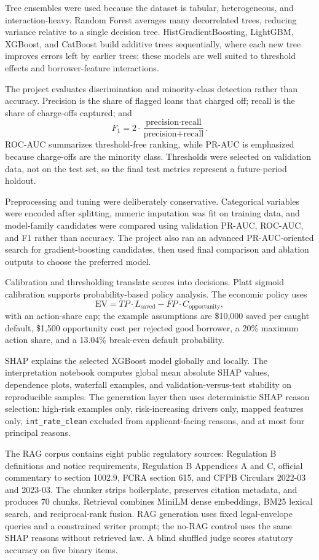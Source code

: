 \documentclass[11pt]{article}
\begin{document}
Tree ensembles were used because the dataset is tabular, heterogeneous, and interaction-heavy. Random Forest averages many decorrelated trees, reducing variance relative to a single decision tree. HistGradientBoosting, LightGBM, XGBoost, and CatBoost build additive trees sequentially, where each new tree improves errors left by earlier trees; these models are well suited to threshold effects and borrower-feature interactions.

The project evaluates discrimination and minority-class detection rather than accuracy. Precision is the share of flagged loans that charged off; recall is the share of charge-offs captured; and
\[
F_1=2\cdot\frac{\text{precision}\cdot\text{recall}}{\text{precision}+\text{recall}}.
\]
ROC-AUC summarizes threshold-free ranking, while PR-AUC is emphasized because charge-offs are the minority class. Thresholds were selected on validation data, not on the test set, so the final test metrics represent a future-period holdout.

Preprocessing and tuning were deliberately conservative. Categorical variables were encoded after splitting, numeric imputation was fit on training data, and model-family candidates were compared using validation PR-AUC, ROC-AUC, and F1 rather than accuracy. The project also ran an advanced PR-AUC-oriented search for gradient-boosting candidates, then used final comparison and ablation outputs to choose the preferred model.

Calibration and thresholding translate scores into decisions. Platt sigmoid calibration supports probability-based policy analysis. The economic policy uses
\[
\text{EV}=TP\cdot L_{\text{saved}}-FP\cdot C_{\text{opportunity}},
\]
with an action-share cap; the example assumptions are \$10,000 saved per caught default, \$1,500 opportunity cost per rejected good borrower, a 20\% maximum action share, and a 13.04\% break-even default probability.

SHAP explains the selected XGBoost model globally and locally. The interpretation notebook computes global mean absolute SHAP values, dependence plots, waterfall examples, and validation-versus-test stability on reproducible samples. The generation layer then uses deterministic SHAP reason selection: high-risk examples only, risk-increasing drivers only, mapped features only, \texttt{int\_rate\_clean} excluded from applicant-facing reasons, and at most four principal reasons.

The RAG corpus contains eight public regulatory sources: Regulation B definitions and notice requirements, Regulation B Appendices A and C, official commentary to section 1002.9, FCRA section 615, and CFPB Circulars 2022-03 and 2023-03. The chunker strips boilerplate, preserves citation metadata, and produces 70 chunks. Retrieval combines MiniLM dense embeddings, BM25 lexical search, and reciprocal-rank fusion. RAG generation uses fixed legal-envelope queries and a constrained writer prompt; the no-RAG control uses the same SHAP reasons without retrieved law. A blind shuffled judge scores statutory accuracy on five binary items.
\end{document}
